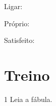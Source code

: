 \begin{escolha}[itemsep=-5pt]
\item Ligar: 

\item Próprio: 


\item Satisfeito: 




\end{escolha}


\pagebreak
\section*{Treino}

\num{1} Leia a fábula.

